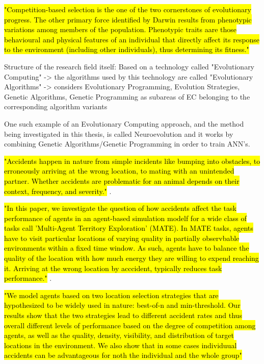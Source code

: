 \hl{"Competition-based selection is the one of the two cornerstones of evolutionary progress. The other primary force identified by Darwin results from phenotypic variations among members of the population. Phenotypic traits aare those behavioural and physical features of an individual that directly affect its response to the environment (including other individuals), thus determining its fitness."} \cite{EibenSmith2003}


Structure of the research field itself: \cite{EibenSmith2003}
Based on a technology called "Evolutionary Computing"
	-> the algorithms used by this technology are called "Evolutionary Algorithms"
	-> considers Evolutionary Programming, Evolution Strategies, Genetic Algorithms, Genetic Programming as subareas of EC belonging to the corresponding algorithm variants

One such example of an Evolutionary Computing approach, and the method being investigated in this thesis, is called Neuroevolution and it works by combining Genetic Algorithms/Genetic Programming in order to train ANN's.


\hl{"Accidents happen in nature from simple incidents like bumping into obstacles, to erroneously arriving at the wrong location, to mating with an unintended partner. Whether accidents are problematic for an animal depends on their context, frequency, and severity."} \cite{ferreira2018accidental}.

\hl{"In this paper, we investigate the question of how accidents affect the task performance of agents in an agent-based simulation modelf for a wide class of tasks call 'Multi-Agent Territory Exploration' (MATE). In MATE tasks, agents have to visit particular locations of varying quality in partially observbable environments within a fixed time window. As such, agents have to balance the quality of the location with how much energy they are willing to expend reaching it. Arriving at the wrong location by acccident, typically reduces task performance."} \cite{ferreira2018accidental}.

\hl{"We model agents based on two location selection strategies that are hypothesized to be widely used in nature: best-of-n and min-threshold. Our results show that the two strategies lead to different accident rates and thus overall different levels of performance based on the degree of competition among agents, as well as the quality, density, visibility, and distribution of target locations in the environment. We also show that in some cases individuual accidents can  be advantageous for noth the individual and the whole group"} \cite{ferreira2018accidental}



